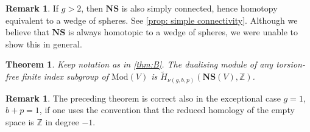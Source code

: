 \documentclass[11pt]{article}
\theoremstyle{plain}
\newtheorem{thmA}{Theorem}
\theoremstyle{definition}
\newtheorem{rem}[thm]{Remark}
\newcommand{\Z}{\mathbb Z}
\newcommand{\compNS}{\mathbf{NS}}
\newcommand{\hmod}{\mathrm{Mod}}
\begin{document}
\begin{rem}
If $g>2$, then $\compNS$ is also simply connected, hence homotopy equivalent to a wedge of spheres. See \cref{prop: simple connectivity}. Although we believe that $\compNS$ is always homotopic to a wedge of spheres, we were unable to show this in general.
\end{rem}

\begin{thmA}\label{thm:C} Keep notation as in \cref{thm:B}.
The dualising module of any torsion-free finite index subgroup of $\hmod(V)$ is $\widetilde H_{\nu(g,b,p)}(\compNS(V),\Z)$.
\end{thmA}

\begin{rem}
The preceding theorem is correct also in the exceptional case $g=1$, $b+p=1$, if one uses the convention that the reduced homology of the empty space is $\Z$ in degree $-1$.
\end{rem}
\end{document}
